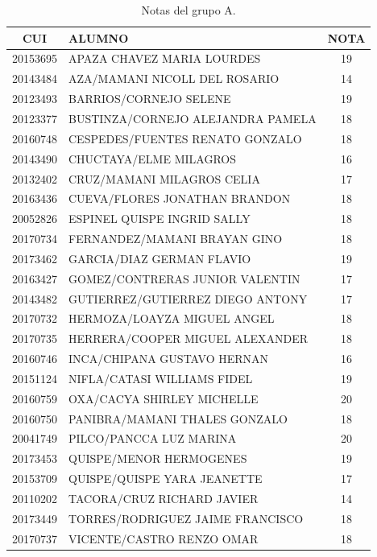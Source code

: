         \begin{table}[H]
        \centering
            \caption{Notas del grupo A.}
            \begin{tabular}{|c|p{10cm}|c|}
                \hline 
                \textbf{CUI} & \textbf{ALUMNO} & \textbf{NOTA}  \\ \hline
        20153695 & APAZA CHAVEZ MARIA LOURDES & 19 \\ \hline 
            20143484 & AZA/MAMANI NICOLL DEL ROSARIO & 14 \\ \hline 
            20123493 & BARRIOS/CORNEJO SELENE & 19 \\ \hline 
            20123377 & BUSTINZA/CORNEJO ALEJANDRA PAMELA & 18 \\ \hline 
            20160748 & CESPEDES/FUENTES RENATO GONZALO & 18 \\ \hline 
            20143490 & CHUCTAYA/ELME MILAGROS & 16 \\ \hline 
            20132402 & CRUZ/MAMANI MILAGROS CELIA & 17 \\ \hline 
            20163436 & CUEVA/FLORES JONATHAN BRANDON & 18 \\ \hline 
            20052826 & ESPINEL QUISPE INGRID SALLY & 18 \\ \hline 
            20170734 & FERNANDEZ/MAMANI BRAYAN GINO & 18 \\ \hline 
            20173462 & GARCIA/DIAZ GERMAN FLAVIO & 19 \\ \hline 
            20163427 & GOMEZ/CONTRERAS JUNIOR VALENTIN & 17 \\ \hline 
            20143482 & GUTIERREZ/GUTIERREZ DIEGO ANTONY & 17 \\ \hline 
            20170732 & HERMOZA/LOAYZA MIGUEL ANGEL & 18 \\ \hline 
            20170735 & HERRERA/COOPER MIGUEL ALEXANDER & 18 \\ \hline 
            20160746 & INCA/CHIPANA GUSTAVO HERNAN & 16 \\ \hline 
            20151124 & NIFLA/CATASI WILLIAMS FIDEL & 19 \\ \hline 
            20160759 & OXA/CACYA SHIRLEY MICHELLE & 20 \\ \hline 
            20160750 & PANIBRA/MAMANI THALES GONZALO & 18 \\ \hline 
            20041749 & PILCO/PANCCA LUZ MARINA & 20 \\ \hline 
            20173453 & QUISPE/MENOR HERMOGENES & 19 \\ \hline 
            20153709 & QUISPE/QUISPE YARA JEANETTE & 17 \\ \hline 
            20110202 & TACORA/CRUZ RICHARD JAVIER & 14 \\ \hline 
            20173449 & TORRES/RODRIGUEZ JAIME FRANCISCO & 18 \\ \hline 
            20170737 & VICENTE/CASTRO RENZO OMAR & 18 \\ \hline 
            		
            \end{tabular}
        \end{table}	
        
